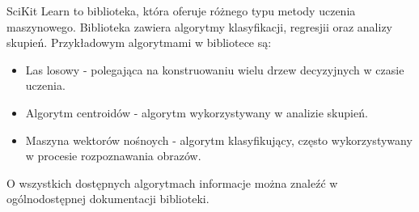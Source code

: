 \quad SciKit Learn to biblioteka, która oferuje różnego typu metody uczenia maszynowego. Biblioteka zawiera algorytmy klasyfikacji, regresjii oraz analizy skupień. Przykładowym algorytmami w bibliotece są:
\begin{itemize}
    \item Las losowy - polegająca na konstruowaniu wielu drzew decyzyjnych w czasie uczenia. 
    \item Algorytm centroidów - algorytm wykorzystywany w analizie skupień.
    \item Maszyna wektorów nośnoych - algorytm klasyfikujący, często wykorzystywany w procesie rozpoznawania obrazów. 
\end{itemize}
O wszystkich dostępnych algorytmach informacje można znaleźć w ogólnodostępnej dokumentacji biblioteki. 


